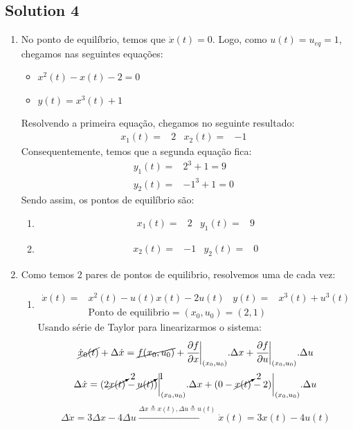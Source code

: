 \documentclass[a4paper,11pt]{article}
\begin{document}
\subsection*{Solution 4}
\begin{enumerate}
	\item No ponto de equilíbrio, temos que $\dot{x}(t)=0$. Logo, como $u(t)=u_{eq}=1$, chegamos nas seguintes equações:
	\begin{itemize}
		\item $x^2(t)-x(t)-2=0$
		\item $y(t)=x^3(t)+1$
	\end{itemize}
	Resolvendo a primeira equação, chegamos no seguinte resultado: 
	\begin{align*}
	x_1(t)=&2& 
	x_2(t)=&{-1}&
	\end{align*}
	Consequentemente, temos que a segunda equação fica:
	\begin{align*}
	y_1(t)=&2^3+1=9&\\
	y_2(t)=&{-1}^3+1=0&
	\end{align*}
	Sendo assim, os pontos de equilíbrio são:
	\begin{enumerate}
		\item 
		\begin{align*}
		x_1(t)=&2 &y_1(t)=&9
		\end{align*}
		\item 
		\begin{align*}
		x_2(t)=&{-1} &y_2(t)=&0
		\end{align*}
	\end{enumerate}
	\item Como temos 2 pares de pontos de equilibrio, resolvemos uma de cada vez:
	\begin{enumerate}
		\item
		\begin{align*}
		\dot{x}(t)=&x^2(t)-u(t)x(t)-2u(t)&
		y(t)=&x^3(t)+u^3(t)&\\
		&\text{Ponto de equilibrio}=(x_0,u_0)=(2,1)
		\end{align*}
		Usando série de Taylor para linearizarmos o sistema:
		\vskip0.1cm
		$$\cancel{\dot{x}_0(t)}+\Delta\dot{x}=\cancel{f(x_0,u_0)}+\cfrac{\partial f}{\partial x}\bigg\rvert_{(x_0,u_0)}.\Delta x+\cfrac{\partial f}{\partial u}\bigg\rvert_{(x_0,u_0)}.\Delta u $$
		\vskip0.1cm
		$$\Delta\dot{x}=(2\cancelto{2}{x(t)}-\cancelto{1}{u(t)})\bigg\rvert_{(x_0,u_0)}.\Delta x+(0-\cancelto{2}{x(t)}-2)\bigg\rvert_{(x_0,u_0)}.\Delta u$$
		\vskip0.1cm
		$$ \Delta\dot{x}=3\Delta x-4\Delta u\xrightarrow{\Delta x\triangleq x(t),\Delta u\triangleq u(t)}\boxed{\dot{x}(t)=3x(t)-4u(t)}$$

\end{enumerate}
\end{enumerate}
\end{document}
